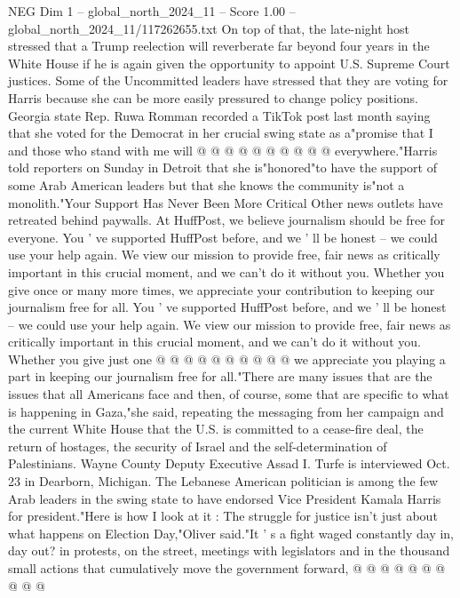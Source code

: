 \begin{textsample}{NEG Dim 1 – global\_north\_2024\_11 – Score 1.00 – global\_north\_2024\_11/117262655.txt}
On top of that, the late-night host stressed that a Trump reelection will reverberate far beyond four years in the White House if he is again given the opportunity to appoint U.S.
Supreme Court justices.
Some of the Uncommitted leaders have stressed that they are voting for Harris because she can be more easily pressured to change policy positions.
Georgia state Rep.
Ruwa Romman recorded a TikTok post last month saying that she voted for the Democrat in her crucial swing state as a"promise that I and those who stand with me will @ @ @ @ @ @ @ @ @ @ everywhere."Harris told reporters on Sunday in Detroit that she is"honored"to have the support of some Arab American leaders but that she knows the community is"not a monolith."Your Support Has Never Been More Critical Other news outlets have retreated behind paywalls.
At HuffPost, we believe journalism should be free for everyone.
You ' ve supported HuffPost before, and we ' ll be honest -- we could use your help again.
We view our mission to provide free, fair news as critically important in this crucial moment, and we can't do it without you.
Whether you give once or many more times, we appreciate your contribution to keeping our journalism free for all.
You ' ve supported HuffPost before, and we ' ll be honest -- we could use your help again.
We view our mission to provide free, fair news as critically important in this crucial moment, and we can't do it without you.
Whether you give just one @ @ @ @ @ @ @ @ @ @ we appreciate you playing a part in keeping our journalism free for all."There are many issues that are the issues that all Americans face and then, of course, some that are specific to what is happening in Gaza,"she said, repeating the messaging from her campaign and the current White House that the U.S. is committed to a cease-fire deal, the return of hostages, the security of Israel and the self-determination of Palestinians.
Wayne County Deputy Executive Assad I.
Turfe is interviewed Oct. 23 in Dearborn, Michigan.
The Lebanese American politician is among the few Arab leaders in the swing state to have endorsed Vice President Kamala Harris for president."Here is how I look at it : The struggle for justice isn't just about what happens on Election Day,"Oliver said."It ' s a fight waged constantly day in, day out? in protests, on the street, meetings with legislators and in the thousand small actions that cumulatively move the government forward, @ @ @ @ @ @ @ @ @ @

\end{textsample}
